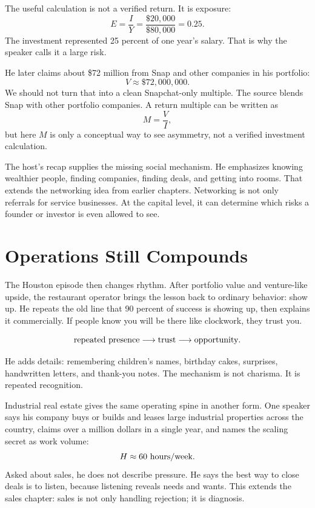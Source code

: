 \documentclass[11pt,oneside]{book}
\begin{document}
The useful calculation is not a verified return. It is exposure:
\[
E=\frac{I}{Y}
=
\frac{\$20{,}000}{\$80{,}000}
=
0.25.
\]
The investment represented 25 percent of one year's salary. That is why the speaker calls it a large risk.

He later claims about \$72 million from Snap and other companies in his portfolio:
\[
V\approx \$72{,}000{,}000.
\]
We should not turn that into a clean Snapchat-only multiple. The source blends Snap with other portfolio companies. A return multiple can be written as
\[
M=\frac{V}{I},
\]
but here \(M\) is only a conceptual way to see asymmetry, not a verified investment calculation.

The host's recap supplies the missing social mechanism. He emphasizes knowing wealthier people, finding companies, finding deals, and getting into rooms. That extends the networking idea from earlier chapters. Networking is not only referrals for service businesses. At the capital level, it can determine which risks a founder or investor is even allowed to see.

\section{Operations Still Compounds}

The Houston episode then changes rhythm. After portfolio value and venture-like upside, the restaurant operator brings the lesson back to ordinary behavior: show up. He repeats the old line that 90 percent of success is showing up, then explains it commercially. If people know you will be there like clockwork, they trust you.

\[
\hbox{repeated presence}
\longrightarrow
\hbox{trust}
\longrightarrow
\hbox{opportunity}.
\]

He adds details: remembering children's names, birthday cakes, surprises, handwritten letters, and thank-you notes. The mechanism is not charisma. It is repeated recognition.

Industrial real estate gives the same operating spine in another form. One speaker says his company buys or builds and leases large industrial properties across the country, claims over a million dollars in a single year, and names the scaling secret as work volume:
\[
H\approx 60\ \hbox{hours/week}.
\]
Asked about sales, he does not describe pressure. He says the best way to close deals is to listen, because listening reveals needs and wants. This extends the sales chapter: sales is not only handling rejection; it is diagnosis.
\end{document}
